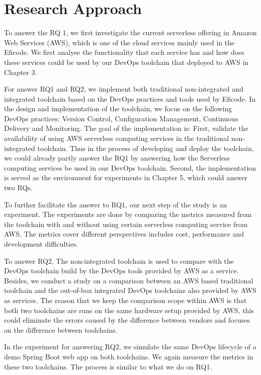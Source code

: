 \section{Research Approach} 
\par
To answer the RQ 1, we first investigate the current serverless offering in Amazon Web Services (AWS), which is one of the cloud services mainly used in the Eficode. We first analyse the functionality that each service has and how does these services could be used by our DevOps toolchain that deployed to AWS in Chapter 3.
\par
For answer RQ1 and RQ2, we implement both traditional non-integrated and integrated toolchain based on the DevOps practices and tools used by Eficode. In the design and implementation of the toolchain, we focus on the following DevOps practices: Version Control, Configuration Management, Continuous Delivery and Monitoring. The goal of the implementation is: First, validate the availability of using AWS serverless computing services in the traditional non-integrated toolchain. Thus in the process of developing and deploy the toolchain, we could already partly answer the RQ1 by answering how the Serverless computing services be used in our DevOps toolchain. Second, the implementation is served as the environment for experiments in Chapter 5, which could answer two RQs.
\par
To further facilitate the answer to RQ1, our next step of the study is an experiment.
The experiments are done by comparing the metrics measured from the toolchain with and without using certain serverless computing service from AWS. The metrics cover different perspectives includes cost, performance and development difficulties. 
\par
To answer RQ2, The non-integrated toolchain is used to compare with the DevOps toolchain build by the DevOps tools provided by AWS as a service.
Besides, we conduct a study on a comparison between an AWS based traditional toolchain and the out-of-box integrated DevOps toolchains also provided by AWS as services. The reason that we keep the comparison scope within AWS is that both two toolchains are runs on the same hardware setup provided by AWS, this could eliminate the errors caused by the difference between vendors and focuses on the difference between toolchains.
\par
In the experiment for answering RQ2, we simulate the same DevOps lifecycle of a demo Spring Boot web app on both toolchains. We again measure the metrics in these two toolchains. The process is similar to what we do on RQ1.
